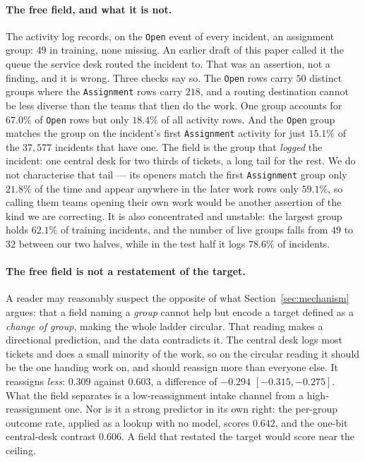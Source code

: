 \documentclass[preprint,12pt]{elsarticle}
\begin{document}
\paragraph{The free field, and what it is not.}
The activity log records, on the \texttt{Open} event of every incident, an
assignment group: $49$ in training, none missing. An earlier draft of this
paper called it the queue the service desk routed the incident to. That was
an assertion, not a finding, and it is wrong. Three checks say so. The
\texttt{Open} rows carry $50$ distinct groups where the \texttt{Assignment}
rows carry $218$, and a routing destination cannot be less diverse than the
teams that then do the work. One group accounts for $67.0\%$ of
\texttt{Open} rows but only $18.4\%$ of all activity rows. And the
\texttt{Open} group matches the group on the incident's first
\texttt{Assignment} activity for just $15.1\%$ of the $37{,}577$ incidents
that have one. The field is the group that \emph{logged} the incident: one central desk for
two thirds of tickets, a long tail for the rest. We do not characterise that
tail --- its openers match the first \texttt{Assignment} group only $21.8\%$
of the time and appear anywhere in the later work rows only $59.1\%$, so
calling them teams opening their own work would be another assertion of the
kind we are correcting.
It is also concentrated and unstable: the largest group holds $62.1\%$ of
training incidents, and the number of live groups falls from $49$ to $32$
between our two halves, while in the test half it logs $78.6\%$ of
incidents.

\paragraph{The free field is not a restatement of the target.}
A reader may reasonably suspect the opposite of what
Section~\ref{sec:mechanism} argues: that a field naming a \emph{group}
cannot help but encode a target defined as a \emph{change of group}, making
the whole ladder circular. That reading makes a directional prediction, and
the data contradicts it. The central desk logs most tickets and does a small
minority of the work, so on the circular reading it should be the one handing
work on, and should reassign more than everyone else. It reassigns
\emph{less}: $0.309$ against $0.603$, a difference of $-0.294$
$[-0.315,-0.275]$. What the field separates is a low-reassignment intake
channel from a high-reassignment one. Nor is it a strong predictor in its own
right: the per-group outcome rate, applied as a lookup with no model, scores
$0.642$, and the one-bit central-desk contrast $0.606$. A field that restated
the target would score near the ceiling.
\end{document}

